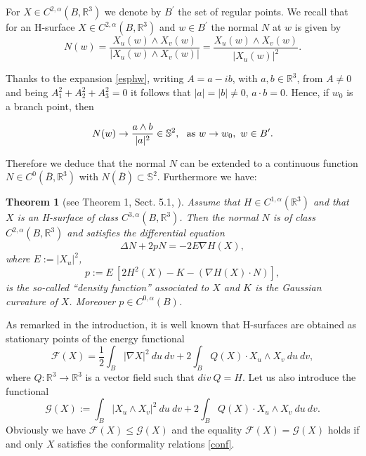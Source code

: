 \documentclass[a4paper,reqno,10pt,oneside]{amsart}
\numberwithin{equation}{section}
\newtheorem{theorem}{Theorem}[section]
\begin{document}
For $X \in C^{2,\alpha}(B, {\mathbb R}^3)$ we denote by ${B}^\prime$ the set of regular points. We recall that for an H-surface $X \in C^{2,\alpha}(B, {\mathbb R}^3)$ and $w \in {B}^\prime$ the normal $N$ at $w$ is given by
\begin{equation}\label{normal}
N(w)= \frac{X_u(w)\wedge X_v(w)}{|X_u(w)\wedge X_v(w)|}=\frac{X_u(w)\wedge X_v(w)}{|X_u(w)|^2}.
\end{equation}

Thanks to the expansion \eqref{esphw}, writing $A=a - ib$, with $a, b \in {\mathbb R}^3$, from $A\neq 0$ and being $A_1^2+A_2^2+A_3^2=0$ it follows that $|a|=|b|\neq 0$, $a \cdot b=0$. Hence, if $w_0$ is a branch point, then

$$ N(w) \to \frac{a\wedge b}{|a|^2} \in \mathbb{S}^2, \ \ \hbox{as} \ w \to w_0, \ w \in {B}^\prime.$$

Therefore we deduce that the normal $N$ can be extended to a continuous function $N \in C^0(\overline{B}, {\mathbb R}^3)$ with $N(\overline{B}) \subset \mathbb{S}^2$. Furthermore we have:

\begin{theorem}[see Theorem 1, Sect. 5.1, \cite{MinSurf}]\label{teoeqnorm}
Assume that $H \in C^{1,\alpha}({\mathbb R}^3)$ and that $X$ is an H-surface of class $C^{3,\alpha}(B,{\mathbb R}^3)$. Then the normal $N$  is of class $C^{2,\alpha}(B,{\mathbb R}^3)$ and satisfies the differential equation
\begin{equation}\label{eqsoddnorm}
\Delta N + 2 pN = - 2E \nabla H (X), 
\end{equation}
where $E:=|X_u|^2$,
\begin{equation}\label{densityfunct}
 p:= E \ [2H^2(X) - K -  (\nabla H(X)\cdot N)],
\end{equation}
is the so-called ``density function'' associated to $X$ and $K$ is the Gaussian curvature of $X$. Moreover $p \in C^{0,\alpha}(B)$.
\end{theorem}

As remarked in the introduction, it is well known that H-surfaces are obtained as stationary points of the energy functional 
\begin{equation}\label{enfunct}
\mathcal{F}(X)= \frac{1}{2}\int_B |\nabla X|^2 \ du \ dv + 2\int_B Q(X) \cdot X_u \wedge X_v \ du \ dv,
\end{equation}
where $Q\colon{\mathbb R}^3 \to {\mathbb R}^3$ is a vector field such that $div\ Q = H$. Let us also introduce the functional 
$$\mathcal{G}(X):=\int_B |X_u \wedge X_v|^2 \ du \ dv + 2\int_B Q(X) \cdot X_u \wedge X_v \ du \ dv.$$ Obviously we have $\mathcal{F}(X) \leq \mathcal{G}(X)$ and the equality $\mathcal{F}(X)=\mathcal{G}(X)$ holds if and only $X$ satisfies the conformality relations \eqref{conf}.\\
\end{document}
